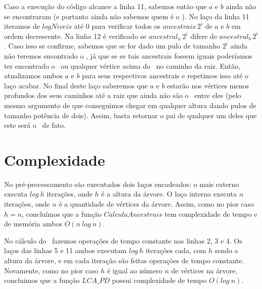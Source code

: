 Caso a execução do código alcance a linha 11, sabemos então que $a$ e $b$ ainda não se encontraram (e portanto ainda não sabemos quem é o \LCA). No laço da linha 11 iteramos de $logNiveis$ até 0 para verificar todos os $ancestrais\ 2^i$ de $a$ e $b$ em ordem decrescente. Na linha 12 é verificado se $ancestral_a\ 2^i$ difere de $ancestral_b\ 2^i$. Caso isso se confirme, sabemos que se for dado um pulo de tamanho $2^i$ ainda não teremos encontrado o \LCA, já que se se tais ancestrais fossem iguais poderíamos ter encontrado o \LCA\ ou qualquer vértice acima do \LCA\ no caminho da raiz. Então, atualizamos ambos $a$ e $b$ para seus respectivos ancestrais e repetimos isso até o laço acabar. No final deste laço saberemos que $a$ e $b$ estarão nos vértices menos profundos dos seus caminhos até a raiz que ainda não são o \LCA\ entre eles (pelo mesmo argumento de que conseguimos chegar em qualquer altura dando pulos de tamanho potência de dois). Assim, basta retornar o pai de qualquer um deles que este será o \LCA\ de fato.

\section{Complexidade}

No pré-processamento são executados dois laços encadeados: o mais externo executa $log\ h$ iterações, onde $h$ é a altura da árvore. O laço interno executa $n$ iterações, onde $n$ é a quantidade de vértices da árvore. Assim, como no pior caso $h = n$, concluímos que a função $CalculaAncestrais$ tem complexidade de tempo e de memória ambos $O(n\ log\ n)$.

No cálculo do \LCA\ fazemos operações de tempo constante nas linhas 2, 3 e 4. Os laços das linhas 5 e 11 ambos executam $log\ h$ iterações cada, com $h$ sendo a altura da árvore, e em cada iteração são feitas operações de tempo constante. Novamente, como no pior caso $h$ é igual ao número $n$ de vértices na árvore, concluimos que a função $LCA\_PD$ possui complexidade de tempo $O(log\ n)$.